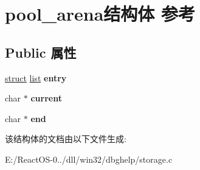 \hypertarget{structpool__arena}{}\section{pool\+\_\+arena结构体 参考}
\label{structpool__arena}
\subsection*{Public 属性}
\begin{DoxyCompactItemize}
\item 
\mbox{\label{structpool__arena_a298da000bc12acbeb418b19e0bb939fc}} 
\hyperlink{interfacestruct}{struct} \hyperlink{classlist}{list} {\bfseries entry}
\item 
\mbox{\label{structpool__arena_a72a2ff004bdd4784d3f0b660ff1cb85e}} 
char $\ast$ {\bfseries current}
\item 
\mbox{\label{structpool__arena_ab892647f1273fb828fe67b09d8a0e643}} 
char $\ast$ {\bfseries end}
\end{DoxyCompactItemize}


该结构体的文档由以下文件生成\+:\begin{DoxyCompactItemize}
\item 
E\+:/\+React\+O\+S-\/0../dll/win32/dbghelp/storage.\+c\end{DoxyCompactItemize}
